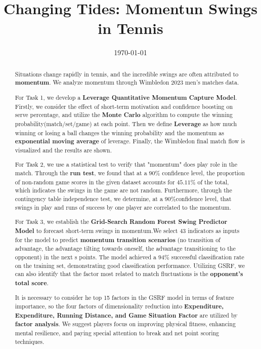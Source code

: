 \documentclass{mcmthesis}
\title{Changing Tides: Momentun Swings in Tennis}
\date{\today}
\begin{document}
\begin{abstract}

  Situations change rapidly in tennis, and the incredible swings are often attributed to \textbf{momentum}. 
  We analyze momentum through Wimbledon 2023 men’s matches data.\par
  For Task 1, we develop a \textbf{Leverage Quantitative Momentum Capture Model}. Firstly,
  we consider the effect of short-term motivation and confidence boosting on serve percentage,
  and utilize the \textbf{Monte Carlo} algorithm to compute the winning probability(match/set/game)
  at each point. Then we define \textbf{Leverage} as how much winning or losing a ball changes the
  winning probability and the momentum as \textbf{exponential moving average} of leverage. Finally,
  the Wimbledon final match flow is visualized and the results are shown.\par
  For Task 2, we use a statistical test to verify that "momentum" does play role in the match.
  Through the \textbf{run test}, we found that at a $90\%$ confidence level, the proportion of non-random
  game scores in the given dataset accounts for $45.11\%$ of the total, which indicates the swings in
  the game are not random. Furthermore, through the contingency table independence test, we
  determine, at a $90\%$confidence level, that swings in play and runs of success by one player are
  correlated to the momentum.\par
  For Task 3, we establish the \textbf{Grid-Search Random Forest Swing Predictor Model} to forecast short-term 
  swings in momentum.We select 43 indicators as inputs for the model to predict
  \textbf{momentum transition scenarios} (no transition of advantage, the advantage tilting towards
  oneself, the advantage transitioning to the opponent) in the next s points. The model achieved a
  $94\%$ successful classification rate on the training set, demonstrating good classification performance. 
  Utilizing GSRF, we can also identify that the factor most related to match fluctuations
  is the \textbf{opponent’s total score}.\par
  It is necessary to consider he top 15 factors in the GSRF model in terms of feature importance,
  so the four factors of dimensionality reduction into \textbf{Expenditure, Expenditure, Running
  Distance, and Game Situation Factor} are utilized by \textbf{factor analysis}. We suggest players
  focus on improving physical fitness, enhancing mental resilience, and paying special attention
  to break and net point scoring techniques.\par

\end{abstract}
\end{document}
